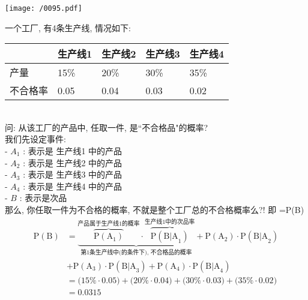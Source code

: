 \documentclass[UTF8]{ctexart}
\begin{document}
	\texttt{[image: /0095.pdf]}
	
	
	\begin{myEnvSample}
		一个工厂, 有4条生产线, 情况如下: \\	
		\begin{tabular}{|l| l| l| l| l|}
			\hline
		 	&  生产线1  & 生产线2  &  生产线3 & 生产线4 \\
			\hline
			产量 &  15\% & 20\% & 30\% & 35\% \\
			\hline
			不合格率 &  0.05 & 0.04 & 0.03 & 0.02 \\
			\hline
		\end{tabular} \\
	
	问: 从该工厂的产品中, 任取一件, 是``不合格品"的概率? \\
	
	我们先设定事件: \\
	- $A_1$ : 表示是 生产线1 中的产品 \\
	- $A_2$ : 表示是 生产线2 中的产品 \\
	- $A_3$ : 表示是 生产线3 中的产品 \\
	- $A_4$ : 表示是 生产线4 中的产品 \\
	- $B$ : 表示是次品 \\
	
	那么, 你任取一件为不合格的概率, 不就是整个工厂总的不合格概率么?! 即 =P(B) \\		
		\begin{align*}
\text{P}\left( \text{B} \right) 
	&=\underset{\text{第1条生产线中(的条件下),\ 不合格品的概率}}{\underbrace{\overset{\text{产品属于生产线1的概率}}{\overbrace{\text{P}\left( \text{A}_1 \right) }}\cdot \overset{\text{生产线1中的次品率}}{\overbrace{\text{P}\left( \text{B|A}_1 \right) }}}}+\text{P}\left( \text{A}_2 \right) \cdot \text{P}\left( \text{B|A}_2 \right)  \\
	& +\text{P}\left( \text{A}_3 \right) \cdot \text{P}\left( \text{B|A}_3 \right) +\text{P}\left( \text{A}_4 \right) \cdot \text{P}\left( \text{B|A}_4 \right)\\
	&=\text{(15\%}\cdot 0.05\text{)}+\text{(20\%}\cdot 0.04\text{)}+\text{(30\%}\cdot 0.03\text{)}+\text{(35\%}\cdot 0.02\text{)}\\
	&=0.0315
		\end{align*}
	\end{myEnvSample}
\end{document}
